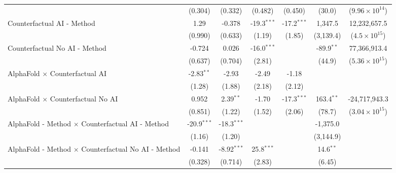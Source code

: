 \begin{tabular}{lcccccc}
                                                              & (0.304)       & (0.332)       & (0.482)       & (0.450)       & (30.0)        & ($9.96\times 10^{14}$)\\    
   Counterfactual AI - Method                                 & 1.29          & -0.378        & -19.3$^{***}$ & -17.2$^{***}$ & 1,347.5       & 12,232,657.5\\   
                                                              & (0.990)       & (0.633)       & (1.19)        & (1.85)        & (3,139.4)     & ($4.5\times 10^{15}$)\\    
   Counterfactual No AI - Method                              & -0.724        & 0.026         & -16.0$^{***}$ &               & -89.9$^{**}$  & 77,366,913.4\\   
                                                              & (0.637)       & (0.704)       & (2.81)        &               & (44.9)        & ($5.36\times 10^{15}$)\\    
   AlphaFold $\times$ Counterfactual AI                       & -2.83$^{**}$  & -2.93         & -2.49         & -1.18         &               &   \\   
                                                              & (1.28)        & (1.88)        & (2.18)        & (2.12)        &               &   \\   
   AlphaFold $\times$ Counterfactual No AI                    & 0.952         & 2.39$^{**}$   & -1.70         & -17.3$^{***}$ & 163.4$^{**}$  & -24,717,943.3\\   
                                                              & (0.851)       & (1.22)        & (1.52)        & (2.06)        & (78.7)        & ($3.04\times 10^{15}$)\\    
   AlphaFold - Method $\times$ Counterfactual AI - Method     & -20.9$^{***}$ & -18.3$^{***}$ &               &               & -1,375.0      &   \\   
                                                              & (1.16)        & (1.20)        &               &               & (3,144.9)     &   \\   
   AlphaFold - Method $\times$ Counterfactual No AI - Method  & -0.141        & -8.92$^{***}$ & 25.8$^{***}$  &               & 14.6$^{**}$   &   \\   
                                                              & (0.328)       & (0.714)       & (2.83)        &               & (6.45)        &   \\   

\end{tabular}
